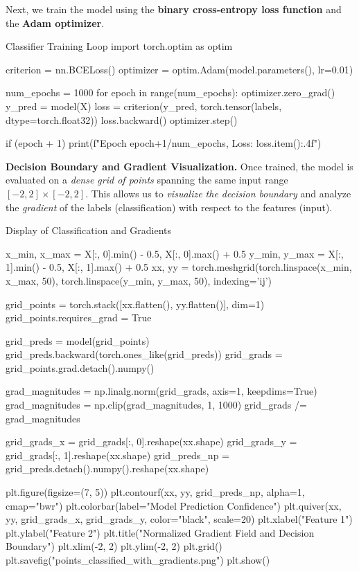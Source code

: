 Next, we train the model using the \textbf{binary cross-entropy loss function} and the \textbf{Adam optimizer}.

\begin{codeonly}{Classifier Training Loop}
import torch.optim as optim

criterion = nn.BCELoss()
optimizer = optim.Adam(model.parameters(), lr=0.01)

num_epochs = 1000
for epoch in range(num_epochs):
    optimizer.zero_grad()
    y_pred = model(X)
    loss = criterion(y_pred, torch.tensor(labels, dtype=torch.float32))
    loss.backward()
    optimizer.step()

    if (epoch + 1) %
        print(f"Epoch {epoch+1}/{num_epochs}, Loss: {loss.item():.4f}")
\end{codeonly}

{\bf Decision Boundary and Gradient Visualization.} Once trained, the model is evaluated on a {\em dense grid of points} spanning the same input range $[-2,2] \times [-2,2]$. This allows us to {\em visualize the decision boundary} and analyze the {\em gradient} of the labels (classification) with respect to the features (input).

\begin{codeonly}{Display of Classification and Gradients}

x_min, x_max = X[:, 0].min() - 0.5, X[:, 0].max() + 0.5
y_min, y_max = X[:, 1].min() - 0.5, X[:, 1].max() + 0.5
xx, yy = torch.meshgrid(torch.linspace(x_min, x_max, 50),
                        torch.linspace(y_min, y_max, 50),
                        indexing='ij')

grid_points = torch.stack([xx.flatten(), yy.flatten()], dim=1)  
grid_points.requires_grad = True

grid_preds = model(grid_points)
grid_preds.backward(torch.ones_like(grid_preds))
grid_grads = grid_points.grad.detach().numpy()

grad_magnitudes = np.linalg.norm(grid_grads, axis=1, keepdims=True)
grad_magnitudes = np.clip(grad_magnitudes, 1, 1000)
grid_grads /= grad_magnitudes

grid_grads_x = grid_grads[:, 0].reshape(xx.shape)
grid_grads_y = grid_grads[:, 1].reshape(xx.shape)
grid_preds_np = grid_preds.detach().numpy().reshape(xx.shape)

plt.figure(figsize=(7, 5))
plt.contourf(xx, yy, grid_preds_np, alpha=1, cmap="bwr")
plt.colorbar(label="Model Prediction Confidence")
plt.quiver(xx, yy, grid_grads_x, grid_grads_y, color="black", scale=20)
plt.xlabel("Feature 1")
plt.ylabel("Feature 2")
plt.title("Normalized Gradient Field and Decision Boundary")
plt.xlim(-2, 2)
plt.ylim(-2, 2)
plt.grid()
plt.savefig("points_classified_with_gradients.png")
plt.show()
\end{codeonly}

